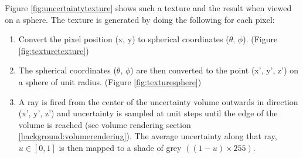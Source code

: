 Figure \ref{fig:uncertaintytexture} shows such a texture and the result when viewed on a sphere. The texture is generated by doing the following for each pixel:

\begin{enumerate}
  \item Convert the pixel position (x, y) to spherical coordinates ($\theta$, $\phi$). (Figure \ref{fig:texturetexture})
  \item The spherical coordinates ($\theta$, $\phi$) are then converted to the point (x', y', z') on a sphere of unit radius. (Figure \ref{fig:texturesphere})
  \item A ray is fired from the center of the uncertainty volume outwards in direction (x', y', z') and uncertainty is sampled at unit steps until the edge of the volume is reached (see volume rendering section \ref{background:volumerendering}). The average uncertainty along that ray, $u \in [0, 1]$ is then mapped to a shade of grey $((1 - u) \times 255)$.
\end{enumerate}

